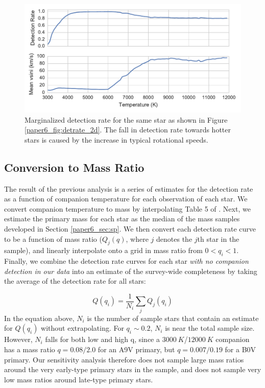 \begin{figure}[t]
\includegraphics[width=\columnwidth]{Figures/paper6_HIP_24244_20130919_marginalized.pdf}
\caption{Marginalized detection rate for the same star as shown in Figure \ref{paper6_fig:detrate_2d}. The fall in detection rate towards hotter stars is caused by the increase in typical rotational speeds.}
\label{paper6_fig:marginalized}
\end{figure}

\subsection{Conversion to Mass Ratio}

The result of the previous analysis is a series of estimates for the detection rate as a function of companion temperature for each observation of each star. We convert companion temperature to mass by interpolating Table 5 of \citet{Pecaut2013}. Next, we estimate the primary mass for each star as the median of the mass samples developed in Section \ref{paper6_sec:sp}. We then convert each detection rate curve to be a function of mass ratio ($Q_j(q)$, where $j$ denotes the $j$th star in the sample), and linearly interpolate onto a grid in mass ratio from $0 < q_i < 1$. Finally, we combine the detection rate curves for each star \emph{with no companion detection in our data} into an estimate of the survey-wide completeness by taking the average of the detection rate for all stars:

\begin{equation}
Q(q_i) = \frac{1}{N_i} \sum_j Q_j(q_i)
\label{paper6_eqn:completeness}
\end{equation}
In the equation above, $N_i$ is the number of sample stars that contain an estimate for $Q(q_i)$ without extrapolating. For $q_i \sim 0.2$, $N_i$ is near the total sample size. However, $N_i$ falls for both low and high q, since a $3000\ K$/$12000\ K$ companion has a mass ratio $q = 0.08/2.0$ for an A9V primary, but $q = 0.007/0.19$ for a B0V primary. Our sensitivity analysis therefore does not sample large mass ratios around the very early-type primary stars in the sample, and does not sample very low mass ratios around late-type primary stars.


